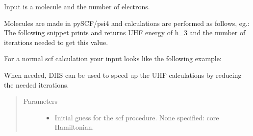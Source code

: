 \documentclass[letterpaper,10pt,english]{sphinxmanual}
\begin{document}
\begin{fulllineitems}
\label{\detokenize{cUHF_b:hf.HartreeFock.cUHF_b.MF}}
Input is a molecule and the number of electrons.

Molecules are made in pySCF/psi4 and calculations are performed as follows, eg.:
The following snippet prints and returns UHF energy of h\_3
and the number of iterations needed to get this value.

For a normal scf calculation your input looks like the following example:

\begin{sphinxVerbatim}[commandchars=\\\{\}]
   
          
   
\end{sphinxVerbatim}

\begin{fulllineitems}
\label{\detokenize{cUHF_b:hf.HartreeFock.cUHF_b.MF.diis}}
When needed, DIIS can be used to speed up the UHF calculations by reducing the needed iterations.
\begin{quote}\begin{description}
\item[{Parameters}] \leavevmode\begin{itemize}
\item {} 
 \textendash{} Initial guess for the scf procedure. None specified: core Hamiltonian.


\end{itemize}
\end{description}
\end{quote}
\end{fulllineitems}
\end{fulllineitems}
\end{document}
